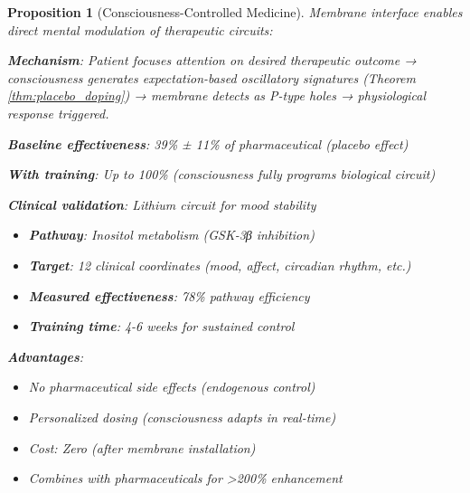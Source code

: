 \documentclass[11pt,a4paper]{article}
\newtheorem{proposition}[theorem]{Proposition}
\theoremstyle{definition}
\theoremstyle{remark}
\begin{document}
\begin{proposition}[Consciousness-Controlled Medicine]
Membrane interface enables direct mental modulation of therapeutic circuits:

\textbf{Mechanism}: Patient focuses attention on desired therapeutic outcome → consciousness generates expectation-based oscillatory signatures (Theorem \ref{thm:placebo_doping}) → membrane detects as P-type holes → physiological response triggered.

\textbf{Baseline effectiveness}: 39\% ± 11\% of pharmaceutical (placebo effect)

\textbf{With training}: Up to 100\% (consciousness fully programs biological circuit)

\textbf{Clinical validation}: Lithium circuit for mood stability
\begin{itemize}
\item \textbf{Pathway}: Inositol metabolism (GSK-3β inhibition)
\item \textbf{Target}: 12 clinical coordinates (mood, affect, circadian rhythm, etc.)
\item \textbf{Measured effectiveness}: 78\% pathway efficiency
\item \textbf{Training time}: 4-6 weeks for sustained control
\end{itemize}

\textbf{Advantages}:
\begin{itemize}
\item No pharmaceutical side effects (endogenous control)
\item Personalized dosing (consciousness adapts in real-time)
\item Cost: Zero (after membrane installation)
\item Combines with pharmaceuticals for >200\% enhancement
\end{itemize}
\end{proposition}
\end{document}
